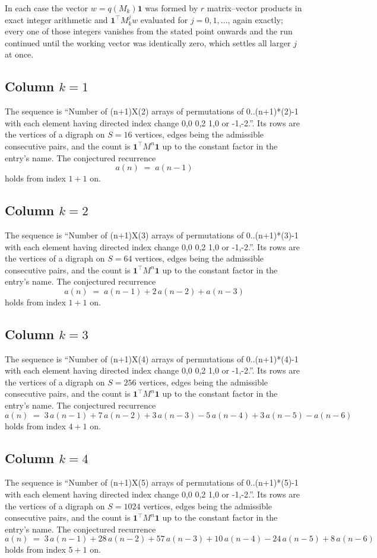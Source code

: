 \documentclass[11pt,a4paper]{article}
\theoremstyle{plain}
\theoremstyle{definition}
\begin{document}
In each case the vector $w=q(M_k)\mathbf{1}$ was formed by $r$ matrix--vector products in
exact integer arithmetic and $\mathbf{1}^{\!\top}M_k^{j}w$ evaluated for $j=0,1,\dots$,
again exactly; every one of those integers vanishes from the stated point onwards and the run
continued until the working vector was identically zero, which settles all larger $j$ at once.

\subsection*{Column $k$$=1$}
The sequence is ``Number of (n+1)X(2) arrays of permutations of 0..(n+1)*(2)-1 with each element having directed index change 0,0 0,2 1,0 or -1,-2.''. Its rows are the vertices of a digraph on
$S=16$ vertices, edges being the admissible consecutive pairs, and the count is
$\mathbf{1}^{\!\top}M^{n}\mathbf{1}$ up to the constant factor in the entry's name.
The conjectured recurrence
\[
a(n)\;=\;a(n-1)
\]
holds from index $1+1$ on.

\subsection*{Column $k$$=2$}
The sequence is ``Number of (n+1)X(3) arrays of permutations of 0..(n+1)*(3)-1 with each element having directed index change 0,0 0,2 1,0 or -1,-2.''. Its rows are the vertices of a digraph on
$S=64$ vertices, edges being the admissible consecutive pairs, and the count is
$\mathbf{1}^{\!\top}M^{n}\mathbf{1}$ up to the constant factor in the entry's name.
The conjectured recurrence
\[
a(n)\;=\;a(n-1) + 2\,a(n-2) + a(n-3)
\]
holds from index $1+1$ on.

\subsection*{Column $k$$=3$}
The sequence is ``Number of (n+1)X(4) arrays of permutations of 0..(n+1)*(4)-1 with each element having directed index change 0,0 0,2 1,0 or -1,-2.''. Its rows are the vertices of a digraph on
$S=256$ vertices, edges being the admissible consecutive pairs, and the count is
$\mathbf{1}^{\!\top}M^{n}\mathbf{1}$ up to the constant factor in the entry's name.
The conjectured recurrence
\[
a(n)\;=\;3\,a(n-1) + 7\,a(n-2) + 3\,a(n-3) - 5\,a(n-4) + 3\,a(n-5) - a(n-6)
\]
holds from index $4+1$ on.

\subsection*{Column $k$$=4$}
The sequence is ``Number of (n+1)X(5) arrays of permutations of 0..(n+1)*(5)-1 with each element having directed index change 0,0 0,2 1,0 or -1,-2.''. Its rows are the vertices of a digraph on
$S=1024$ vertices, edges being the admissible consecutive pairs, and the count is
$\mathbf{1}^{\!\top}M^{n}\mathbf{1}$ up to the constant factor in the entry's name.
The conjectured recurrence
\[
a(n)\;=\;3\,a(n-1) + 28\,a(n-2) + 57\,a(n-3) + 10\,a(n-4) - 24\,a(n-5) + 8\,a(n-6)
\]
holds from index $5+1$ on.
\end{document}
